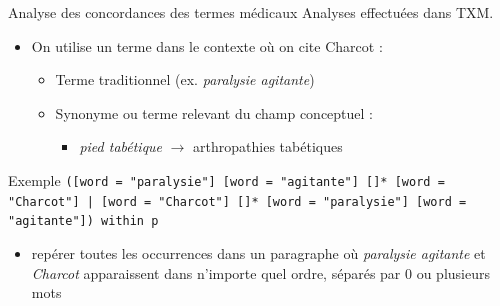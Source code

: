 \begin{frame}{Analyse des concordances des termes médicaux}
	Analyses effectuées dans \textsc{TXM}.
\begin{itemize}
	\item On utilise un terme dans le contexte où on cite Charcot :
\begin{itemize}
	\item Terme traditionnel (ex. \textit{paralysie agitante})
	\item Synonyme ou terme relevant du champ conceptuel :
	\begin{itemize}
		\item \textit{pied tabétique} $\rightarrow$ arthropathies tabétiques
	\end{itemize}
\end{itemize}
\end{itemize}

	\begin{block}{Exemple}
		\texttt{([word = "paralysie"] [word = "agitante"] []* [word = "Charcot"] | [word = "Charcot"] []* [word = "paralysie"] [word = "agitante"]) within p}
		\begin{itemize}
			\item repérer toutes les occurrences dans un paragraphe où \textit{paralysie agitante} et \textit{Charcot} apparaissent dans n'importe quel ordre, séparés par 0 ou plusieurs mots
		\end{itemize}
	\end{block}
\end{frame}


